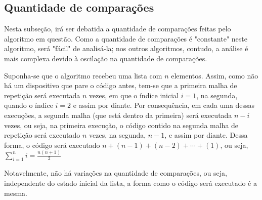 \subsection{Quantidade de comparações}
Nesta subseção, irá ser debatida a quantidade de comparações feitas pelo algoritmo em questão. Como a quantidade de comparações é "constante" neste algoritmo, será "fácil" de analisá-la; nos outros algoritmos, contudo, a análise é mais complexa devido à oscilação na quantidade de comparações.

Suponha-se que o algoritmo recebeu uma lista com $n$ elementos. Assim, como não há um dispositivo que pare o código antes, tem-se que a primeira malha de repetição será executada $n$ vezes, em que o índice inicial $i=1$, na segunda, quando o índice $i=2$ e assim por diante. Por consequência, em cada uma dessas execuções, a segunda malha (que está dentro da primeira) será executada $n-i$ vezes, ou seja, na primeira execução, o código contido na segunda malha de repetição será executado $n$ vezes, na segunda, $n-1$, e assim por diante. Dessa forma, o código será executado $n+(n-1)+(n-2)+\cdots+(1)$, ou seja, $\sum_{i=1}^n i = \frac{n(n+1)}{2}$

Notavelmente, não há variações na quantidade de comparações, ou seja, independente do estado inicial da lista, a forma como o código será executado é a mesma.